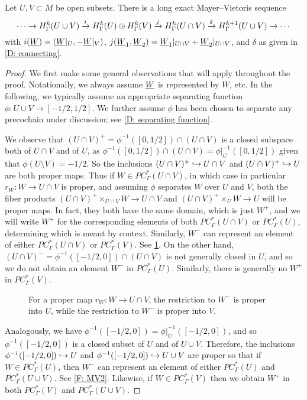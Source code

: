 \begin{theorem}\label{T: absolute MV}
	Let $U,V \subset M$ be open subsets.
	There is a long exact Mayer--Vietoris sequence
	\[
	\cdots \to H^k_\Gamma(U \cup V) \xrightarrow{i} H^k_\Gamma(U) \oplus H^k_\Gamma(V) \xrightarrow{j} H^k_\Gamma(U \cap V) \xrightarrow{\delta} H^{k+1}_\Gamma(U \cup V)\to\cdots
	\]
	with $i(\underline{W}) = (\underline{W}|_U, -\underline{W}|_V)$, $j(\underline{W}_1,\underline{W}_2) = \underline{W}_1|_{U \cap V}+\underline{W}_2|_{U \cap V}$, and $\delta$ as given in \cref{D: connecting}.
\end{theorem}

\begin{proof}
	We first make some general observations that will apply throughout the proof.
	Notationally, we always assume $\underline{W}$ is represented by $W$, etc.
	In the following, we typically assume an appropriate separating function $\phi \colon U \cup V \to [-1/2,1/2]$.
	We further assume $\phi$ has been chosen to separate any precochain under discussion;
	see \cref{D: separating function}.


	We observe that $(U \cap V)^+ = \phi^{-1}([0,1/2])\cap(U \cap V)$ is a closed subspace both of $U \cap V$ and of $U$, as $\phi^{-1}([0,1/2]) \cap (U \cap V) = \phi|_U^{-1}([0,1/2])$ given that $\phi(U\setminus V) = -1/2$.
	So the inclusions $(U \cap V)^+ \hookrightarrow U \cap V$ and $(U \cap V)^+ \hookrightarrow U$ are both proper maps.
	Thus if $W \in PC^*_\Gamma(U \cap V)$, in which case in particular $r_W \colon W \to U \cap V$ is proper, and assuming $\phi$ separates $W$ over $U$ and $V$, both the fiber products $(U \cap V)^+\times_{U \cap V} W \to U \cap V$ and $(U \cap V)^+\times_{U} W \to U$ will be proper maps.
	In fact, they both have the same domain, which is just $W^+$, and we will write $W^+$ for the corresponding elements of both $PC^*_\Gamma(U \cap V)$ or $PC^*_\Gamma(U)$, determining which is meant by context.
	Similarly, $W^-$ can represent an element of either $PC^*_\Gamma(U \cap V)$ or $PC^*_\Gamma(V)$.
	See \cref{F: MV1}.
	On the other hand, $(U \cap V)^- = \phi^{-1}([-1/2,0])\cap(U \cap V)$ is not generally closed in $U$, and so we do not obtain an element $W^-$ in $PC^*_\Gamma(U)$.
	Similarly, there is generally no $W^+$ in $PC^*_\Gamma(V)$.

	\begin{figure}[h]
		
		\caption{For a proper map $r_W \colon W \to U \cap V$, the restriction to $W^+$ is proper into $U$, while the restriction to $W^-$ is proper into $V$.}
		\label{F: MV1}
	\end{figure}

	Analogously, we have $\phi^{-1}([-1/2,0]) = \phi|_U^{-1}([-1/2,0])$, and so $\phi^{-1}([-1/2,0])$ is a closed subset of $U$ and of $U \cup V$.
	Therefore, the inclusions $\phi^{-1}([-1/2,0]) \hookrightarrow U$ and $\phi^{-1}([-1/2,0]) \hookrightarrow U \cup V$ are proper so that if $W \in PC^*_\Gamma(U)$, then $W^-$ can represent an element of either $PC^*_\Gamma(U)$ and $PC^*_\Gamma(U \cup V)$.
	See \cref{F: MV2}.
	Likewise, if $W \in PC^*_\Gamma(V)$ then we obtain $W^+$ in both $PC^*_\Gamma(V)$ and $PC^*_\Gamma(U \cup V)$.


\end{proof}
